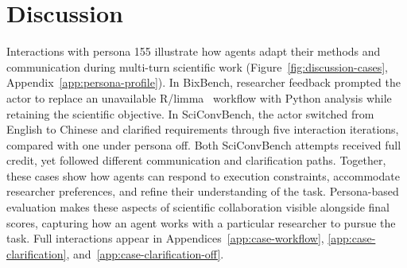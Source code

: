 \section{Discussion}
\label{sec:discussion}

Interactions with persona 155 illustrate how agents adapt their methods
and communication during multi-turn scientific work
(Figure~\ref{fig:discussion-cases}, Appendix~\ref{app:persona-profile}).
In BixBench, researcher feedback prompted the actor to replace an unavailable
R/limma~\cite{ritchie2015limma} workflow with Python analysis while retaining
the scientific objective. In SciConvBench, the actor switched from English
to Chinese and clarified requirements through five interaction iterations,
compared with one under persona off. Both SciConvBench attempts received
full credit, yet followed different communication and clarification paths.
Together, these cases show how agents can respond to execution constraints,
accommodate researcher preferences, and refine their understanding of the
task. Persona-based evaluation makes these aspects of scientific
collaboration visible alongside final scores, capturing how an agent works
with a particular researcher to pursue the task. Full interactions appear in
Appendices~\ref{app:case-workflow}, \ref{app:case-clarification},
and~\ref{app:case-clarification-off}.

